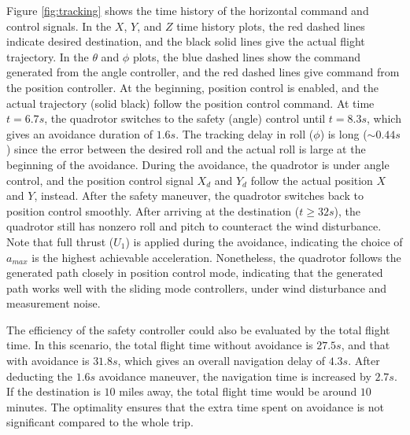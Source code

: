 \documentclass[journal,11pt,onecolumn,draftclsnofoot,]{IEEEtran}
\begin{document}
Figure \ref{fig:tracking} shows the time history of the horizontal command and control signals. In the $X$, $Y$, and $Z$ time history plots, the red dashed lines indicate desired destination, and the black solid lines give the actual flight trajectory. In the $\theta$ and $\phi$ plots, the blue dashed lines show the command generated from the angle controller, and the red dashed lines give command from the position controller. At the beginning, position control is enabled, and the actual trajectory (solid black) follow the position control command. At time $t=6.7s$, the quadrotor switches to the safety (angle) control until $t=8.3s$, which gives an avoidance duration of $1.6s$. The tracking delay in roll ($\phi$) is long ($\sim 0.44s$) since the error between the desired roll and the actual roll is large at the beginning of the avoidance. During the avoidance, the quadrotor is under angle control, and the position control signal $X_d$ and $Y_d$ follow the actual position $X$ and $Y$, instead. After the safety maneuver, the quadrotor switches back to position control smoothly. After arriving at the destination ($t \ge 32 s$), the quadrotor still has nonzero roll and pitch to counteract the wind disturbance. Note that full thrust ($U_1$) is applied during the avoidance, indicating the choice of $a_{max}$ is the highest achievable acceleration. Nonetheless, the quadrotor follows the generated path closely in position control mode, indicating that the generated path works well with the sliding mode controllers, under wind disturbance and measurement noise.

The efficiency of the safety controller could also be evaluated by the total flight time. In this scenario, the total flight time without avoidance is $27.5 s$, and that with avoidance is $31.8 s$, which gives an overall navigation delay of $4.3 s$. After deducting the $1.6 s$ avoidance maneuver, the navigation time is increased by $2.7 s$. If the destination is $10$ miles away, the total flight time would be around $10$ minutes. The optimality ensures that the extra time spent on avoidance is not significant compared to the whole trip.
\end{document}
